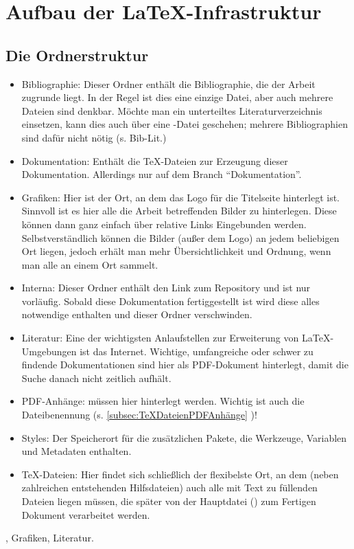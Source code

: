 
\section{Aufbau der \LaTeX-Infrastruktur}
\label{sec:AufbauInfrastruktur}

\subsection{Die Ordnerstruktur}
\label{subsec:Ordnerstruktur}
\begin{itemize}
\item Bibliographie: Dieser Ordner enthält die Bibliographie, die der Arbeit zugrunde liegt. In der Regel ist dies eine einzige Datei, aber auch mehrere Dateien sind denkbar. Möchte man ein unterteiltes Literaturverzeichnis einsetzen, kann dies auch über eine -Datei geschehen; mehrere Bibliographien sind dafür nicht nötig (s. Bib-Lit.)
\item Dokumentation: Enthält die TeX-Dateien zur Erzeugung dieser Dokumentation. Allerdings nur auf dem Branch \enquote{Dokumentation}.
\item Grafiken: Hier ist der Ort, an dem das Logo für die Titelseite hinterlegt ist. Sinnvoll ist es hier alle die Arbeit betreffenden Bilder zu hinterlegen. Diese können dann ganz einfach über relative Links Eingebunden werden. Selbstverständlich können die Bilder (außer dem Logo) an jedem beliebigen Ort liegen, jedoch erhält man mehr Übersichtlichkeit und Ordnung, wenn man alle an einem Ort sammelt.
\item Interna: Dieser Ordner enthält den Link zum Repository und ist nur vorläufig. Sobald diese Dokumentation fertiggestellt ist wird diese alles notwendige enthalten und dieser Ordner verschwinden.
\item Literatur: Eine der wichtigsten Anlaufstellen zur Erweiterung von \LaTeX-Umgebungen ist das Internet. Wichtige, umfangreiche oder schwer zu findende Dokumentationen sind hier als PDF-Dokument hinterlegt, damit die Suche danach nicht zeitlich aufhält.
\item PDF-Anhänge: müssen hier hinterlegt werden. Wichtig ist auch die Dateibenennung (s. \ref{subsec:TeXDateienPDFAnhänge} )!
\item Styles: Der Speicherort für die zusätzlichen Pakete, die Werkzeuge, Variablen und Metadaten enthalten.
\item \TeX-Dateien: Hier findet sich schließlich der flexibelste Ort, an dem (neben zahlreichen entstehenden Hilfsdateien) auch alle mit Text zu füllenden Dateien liegen müssen, die später von der Hauptdatei () zum Fertigen Dokument verarbeitet werden.

\end{itemize}
, Grafiken, Literatur.

